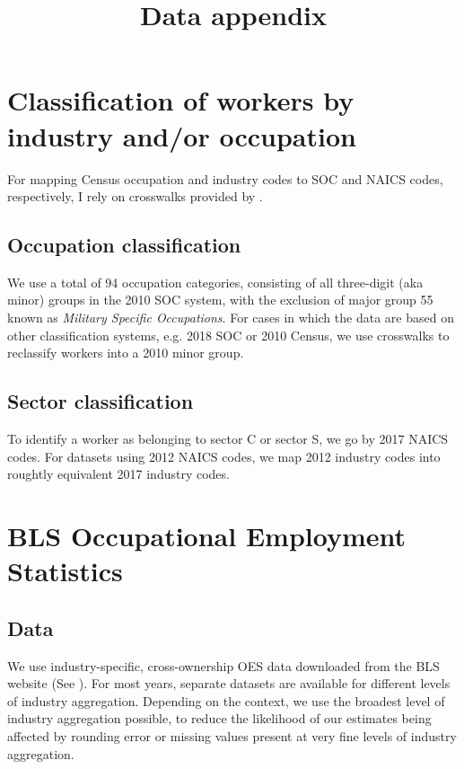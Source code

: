 \documentclass{article}
\title{Data appendix}
\author{}
\date{}
\begin{document}
\maketitle

\tableofcontents

\section{Classification of workers by industry and/or occupation}
For mapping Census occupation and industry codes to SOC and NAICS codes, respectively, I rely on crosswalks provided by \cite{crosswalks}.

\subsection{Occupation classification}
We use a total of 94 occupation categories, consisting of all three-digit (aka minor) groups in the 2010 SOC system, with the exclusion of major group 55 known as \emph{Military Specific Occupations}. For cases in which the data are based on other classification systems, e.g. 2018 SOC or 2010 Census, we use crosswalks to reclassify workers into a 2010 minor group.

\subsection{Sector classification}
To identify a worker as belonging to sector C or sector S, we go by 2017 NAICS codes. For datasets using 2012 NAICS codes, we map 2012 industry codes into roughtly equivalent 2017 industry codes.

\section{BLS Occupational Employment Statistics}
\subsection{Data}
We use industry-specific, cross-ownership OES data downloaded from the BLS website (See \cite{OES}). For most years, separate datasets are available for different levels of industry aggregation. Depending on the context, we use the broadest level of industry aggregation possible, to reduce the likelihood of our estimates being affected by rounding error or missing values present at very fine levels of industry aggregation. 
\end{document}
